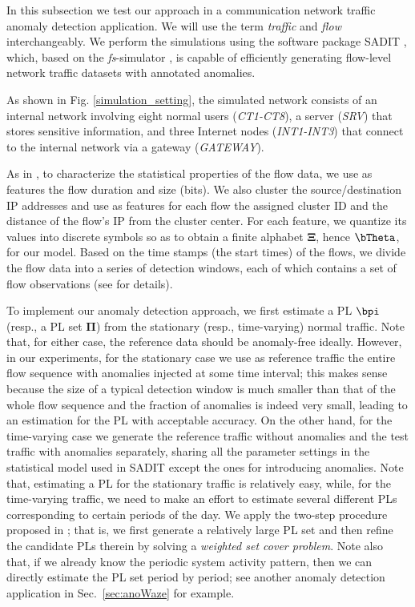 \documentclass[10pt, twocolumn]{IEEEtran}
\begin{document}
In this subsection we test our approach in a communication network
traffic anomaly detection application. We will use the term
\textit{traffic} and \textit{flow} interchangeably. We perform the
simulations using the software package SADIT \cite{SADIT}, which, based
on the \textit{fs}-simulator \cite{fs}, is capable of efficiently
generating flow-level network traffic datasets with annotated anomalies.

As shown in Fig. \ref{simulation_setting}, the simulated network
consists of an internal network involving eight normal users
(\textit{CT1-CT8}), a server (\textit{SRV}) that stores sensitive
information, and three Internet nodes (\textit{INT1-INT3}) that connect
to the internal network via a gateway (\textit{GATEWAY}).

As in \cite[Sec. III.A]{robust-anomaly-tcns}, to characterize the
statistical properties of the flow data, we use as features the flow
duration and size (bits). We also cluster the source/destination IP
addresses and use as features for each flow the assigned cluster ID and
the distance of the flow's IP from the cluster center. For each feature,
we quantize its values into discrete symbols so as to obtain a finite
alphabet $\boldsymbol{\Xi}$, hence ${\bTheta}$, for our
model. Based on the time stamps (the start times) of the flows, we
divide the flow data into a series of detection windows, each of which
contains a set of flow observations (see \cite{robust-anomaly-tcns} for
details).

To implement our anomaly detection approach, we first estimate a PL
$\bpi$ (resp., a PL set $\boldsymbol{\Pi}$) from the stationary (resp.,
time-varying) normal traffic. Note that, for either case, the reference
data should be anomaly-free ideally. However, in our experiments, for
the stationary case we use as reference traffic the entire flow
sequence with anomalies injected at some time interval; this makes sense
because the size of a typical detection window is much smaller than that
of the whole flow sequence and the fraction of anomalies is indeed very
small, leading to an estimation for the PL with acceptable accuracy. On
the other hand, for the time-varying case we generate the reference
traffic without anomalies and the test traffic with anomalies
separately, sharing all the parameter settings in the statistical model
used in SADIT except the ones for introducing anomalies.  Note that,
estimating a PL for the stationary traffic is relatively easy, while,
for the time-varying traffic, we need to make an effort to estimate
several different PLs corresponding to certain periods of the day. We
apply the two-step procedure proposed in \cite{robust-anomaly-tcns};
that is, we first generate a relatively large PL set and then refine the
candidate PLs therein by solving a \textit{weighted set cover
  problem}. Note also that, if we already know the periodic system
activity pattern, then we can directly estimate the PL set period by
period; see another anomaly detection application in
Sec.~\ref{sec:anoWaze} for example.
\end{document}
